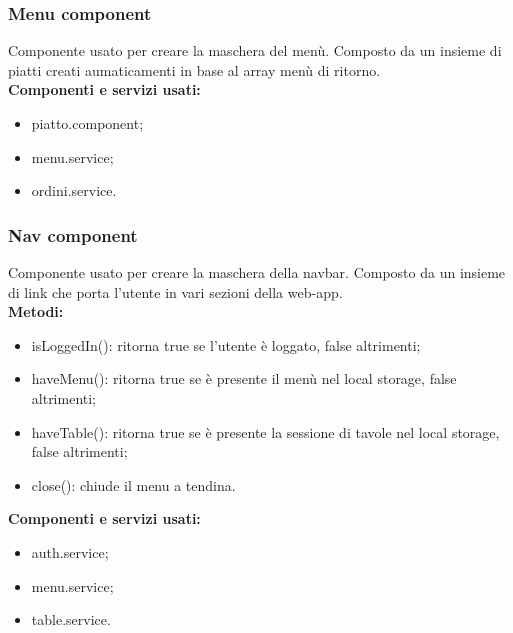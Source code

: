 \label{cap:menu.component}

\subsubsection{Menu component}
Componente usato per creare la maschera del menù. Composto da un insieme di piatti creati aumaticamenti in base al array menù di ritorno.\\
\textbf{Componenti e servizi usati:}
\begin{itemize}
    \item piatto.component;
    \item menu.service;
    \item ordini.service.
\end{itemize}

\subsubsection{Nav component}
Componente usato per creare la maschera della navbar. Composto da un insieme di link che porta l'utente in vari sezioni della web-app.\\
\textbf{Metodi:}
\begin{itemize}
    \item isLoggedIn(): ritorna true se l'utente è loggato, false altrimenti;
    \item haveMenu(): ritorna true se è presente il menù nel local storage, false altrimenti;
    \item haveTable(): ritorna true se è presente la sessione di tavole nel local storage, false altrimenti;
    \item close(): chiude il menu a tendina.
\end{itemize}
\textbf{Componenti e servizi usati:}
\begin{itemize}    
    \item auth.service;
    \item menu.service;
    \item table.service.
\end{itemize}

